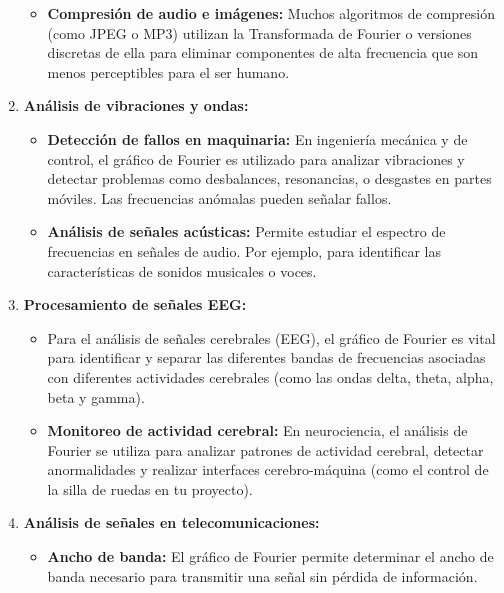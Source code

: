 \documentclass{article}
\begin{document}
\begin{enumerate}
\begin{itemize}
        \item \textbf{Compresión de audio e imágenes:} Muchos algoritmos de compresión (como JPEG o MP3) utilizan la Transformada de Fourier o versiones discretas de ella para eliminar componentes de alta frecuencia que son menos perceptibles para el ser humano.
    \end{itemize}
    
    \item \textbf{Análisis de vibraciones y ondas:}
    \begin{itemize}
        \item \textbf{Detección de fallos en maquinaria:} En ingeniería mecánica y de control, el gráfico de Fourier es utilizado para analizar vibraciones y detectar problemas como desbalances, resonancias, o desgastes en partes móviles. Las frecuencias anómalas pueden señalar fallos.
    
        \item \textbf{Análisis de señales acústicas:} Permite estudiar el espectro de frecuencias en señales de audio. Por ejemplo, para identificar las características de sonidos musicales o voces.
    \end {itemize}
    
    \item \textbf{Procesamiento de señales EEG:}
    \begin{itemize}
        \item Para el análisis de señales cerebrales (EEG), el gráfico de Fourier es vital para identificar y separar las diferentes bandas de frecuencias asociadas con diferentes actividades cerebrales (como las ondas delta, theta, alpha, beta y gamma).
    
        \item \textbf{Monitoreo de actividad cerebral:} En neurociencia, el análisis de Fourier se utiliza para analizar patrones de actividad cerebral, detectar anormalidades y realizar interfaces cerebro-máquina (como el control de la silla de ruedas en tu proyecto).
    \end{itemize}
    \item \textbf{Análisis de señales en telecomunicaciones:}
    \begin{itemize}
        \item \textbf{Ancho de banda:} El gráfico de Fourier permite determinar el ancho de banda necesario para transmitir una señal sin pérdida de información.
    

\end{itemize}
\end{enumerate}
\end{document}
